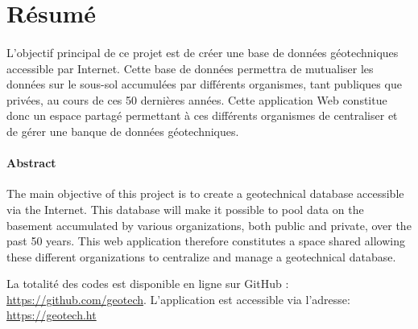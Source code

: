 \section{Résumé}
\paragraph{}
L'objectif principal de ce projet est de créer une base de données géotechni\-ques
 accessible par Internet. Cette base de données permettra de mutualiser les données 
 sur le sous-sol accumulées par différents organismes, tant publiques que privées, 
 au cours de ces 50 dernières années. Cette application Web constitue donc un espace 
 partagé permettant à ces différents organismes de centraliser et de gérer une banque 
 de données géotechniques.


\paragraph{Abstract}
The main objective of this project is to create a geotechnical 
database accessible via the Internet. This database will make it possible to pool data
 on the basement accumulated by various organizations, both public and private,
 over the past 50 years. This web application therefore constitutes a space
 shared allowing these different organizations to centralize and manage a
 geotechnical database.
\bigskip
\bigskip
\par
 {\footnotesize
 La totalité des codes est disponible en ligne sur GitHub : \url{https://github.com/geotech}.
L’application est accessible via l’adresse: \url{https://geotech.ht}

 }
